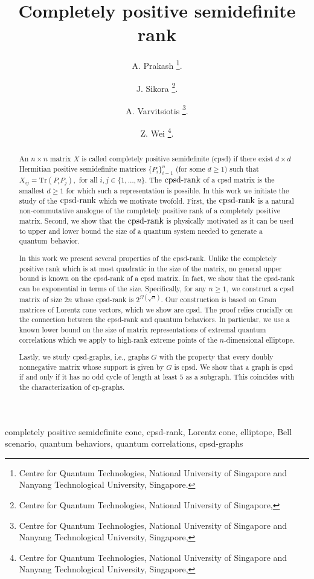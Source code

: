 \documentclass{siamart}
\title{Completely positive semidefinite rank}
\author{
A. Prakash
\thanks{Centre for Quantum Technologies, National University of Singapore and Nanyang Technological University, Singapore.
\email{aprakash@ntu.edu.sg}}.
\and
J. Sikora
\thanks{Centre for Quantum Technologies, National University of Singapore,
\email{cqtjwjs@nus.edu.sg}}.
\and
A. Varvitsiotis
\thanks{Centre for Quantum Technologies, National University of Singapore and Nanyang Technological University, Singapore,
\email{avarvits@gmail.com}}.
\and
Z. Wei
\thanks{Centre for Quantum Technologies, National University of Singapore and  Nanyang Technological University, Singapore, \email{weizhaohui@gmail.com}}.
 
}
\begin{document}
\maketitle

\begin{abstract}
{An $n\times n$} matrix $X$ is called completely positive
semidefinite (cpsd) if there  exist $d\times d$ Hermitian positive
semidefinite {matrices} $\{P_i\}_{i=1}^n$ (for some $d\ge 1$) such
that  $X_{ij}= {\mathrm{Tr}}(P_iP_j),$ for all {$i,j \in \{ 1, \ldots, n \}$}.
The ${\mathrm{cpsd}\textnormal{-rank}}$ of a cpsd matrix is the smallest $d\ge 1$ for which
such a representation is possible. In this work  we initiate the
study of the ${\mathrm{cpsd}\textnormal{-rank}}$ which we motivate twofold. First, the ${\mathrm{cpsd}\textnormal{-rank}}$
is a natural non-commutative analogue of the 
{completely positive rank} of a completely positive matrix.
{Second}, we show that the ${\mathrm{cpsd}\textnormal{-rank}}$ is physically motivated as it
can  be used to upper and lower bound the size of a quantum system
needed to generate a quantum~behavior.

In this work  we {present}  several  properties of the cpsd-rank.
Unlike the completely positive rank  which is at most  quadratic in the size of the matrix, no general upper bound is  known on the cpsd-rank of a cpsd matrix.  In fact, we show that the cpsd-rank can be exponential in terms of the size. Specifically,   for any $n\ge1,$ we construct  a  cpsd matrix of size $2n$ whose  cpsd-rank  is $2^{\Omega(\sqrt{n})}$. Our construction is based on  Gram  matrices of Lorentz  cone vectors, which we show are cpsd. The proof  relies crucially on   the connection between the cpsd-rank  and quantum behaviors. In particular, we use  a  {known} lower bound on the
{size of matrix representations of}
extremal quantum correlations
{which we apply to}
high-rank extreme points of the {$n$-dimensional} elliptope.

{Lastly, we study cpsd-graphs, i.e., graphs $G$ with the property that every doubly nonnegative matrix whose support is given by $G$ is cpsd. We show that a graph  is cpsd  if and only if  it has no odd cycle of length at least {$5$}  as a subgraph.  This coincides with  the characterization of cp-graphs.}
\end{abstract}

\begin{keywords}
completely positive semidefinite cone,
cpsd-rank,
Lorentz cone,
elliptope,
Bell scenario,
quantum behaviors,
quantum correlations,
cpsd-graphs
\end{keywords}
\end{document}
